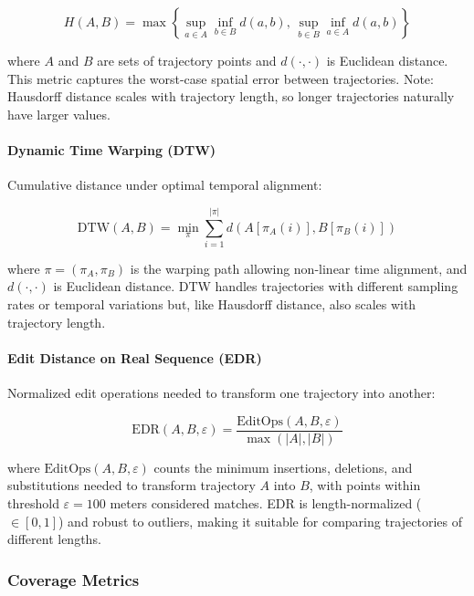 \begin{equation}
H(A, B) = \max \left\{ \sup_{a \in A} \inf_{b \in B} d(a, b), \, \sup_{b \in B} \inf_{a \in A} d(a, b) \right\}
\label{eq:hausdorff-appendix}
\end{equation}

where $A$ and $B$ are sets of trajectory points and $d(\cdot, \cdot)$ is Euclidean distance. This metric captures the worst-case spatial error between trajectories. Note: Hausdorff distance scales with trajectory length, so longer trajectories naturally have larger values.

\paragraph{Dynamic Time Warping (DTW)}

Cumulative distance under optimal temporal alignment:

\begin{equation}
\text{DTW}(A, B) = \min_{\pi} \sum_{i=1}^{|\pi|} d(A[\pi_A(i)], B[\pi_B(i)])
\label{eq:dtw-appendix}
\end{equation}

where $\pi = (\pi_A, \pi_B)$ is the warping path allowing non-linear time alignment, and $d(\cdot, \cdot)$ is Euclidean distance. DTW handles trajectories with different sampling rates or temporal variations but, like Hausdorff distance, also scales with trajectory length.

\paragraph{Edit Distance on Real Sequence (EDR)}

Normalized edit operations needed to transform one trajectory into another:

\begin{equation}
\text{EDR}(A, B, \varepsilon) = \frac{\text{EditOps}(A, B, \varepsilon)}{\max(|A|, |B|)}
\label{eq:edr-appendix}
\end{equation}

where $\text{EditOps}(A, B, \varepsilon)$ counts the minimum insertions, deletions, and substitutions needed to transform trajectory $A$ into $B$, with points within threshold $\varepsilon = 100$ meters considered matches. EDR is length-normalized ($\in [0,1]$) and robust to outliers, making it suitable for comparing trajectories of different lengths.

\subsubsection{Coverage Metrics}
\label{app:coverage-metrics}

